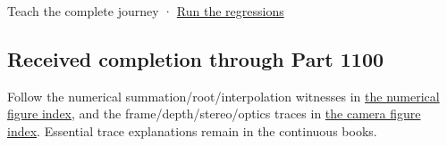 {Teach the complete journey} · \hyperref[appendix-4e2236f53445-representation-codecs-and-bounded-file-laboratory]{Run the regressions}

\subsection{Received completion through Part 1100}\label{appendix-92ff77d4dfdc-received-completion-through-part-1100}

Follow the numerical summation/root/interpolation witnesses in \hyperref[appendix-cb5af353ef77-numerical-reliability-figures-and-their-explanations]{the numerical figure index}, and the frame/depth/stereo/optics traces in \hyperref[appendix-a2b71a18f5a2-figures-and-their-full-explanations]{the camera figure index}. Essential trace explanations remain in the continuous books.
